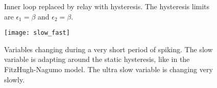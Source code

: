 \documentclass[a4paper, 12pt]{article}
\begin{document}
\begin{figure}[h!]
{
}
\caption{Inner loop replaced by relay with hysteresis. The hysteresis limits are $\epsilon_1 = \beta$ and $\epsilon_2 = \beta$.}
\label{fig:bursting_step1}
\end{figure}



\begin{figure}[tbp]
\texttt{[image: slow\_fast]}
\caption{Variables changing during a very short period of spiking. The slow variable is adapting around the static hysteresis, like in the FitzHugh-Nagumo model. The ultra slow variable is changing very slowly.}
\label{fig:bursting_step2.1}
\end{figure}
\end{document}
